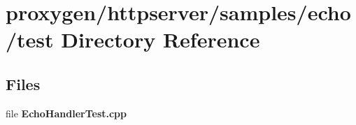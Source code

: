 \section{proxygen/httpserver/samples/echo/test Directory Reference}
\label{dir_1246853a1869355b97e62e25696b4e3d}
\subsection*{Files}
\begin{DoxyCompactItemize}
\item 
file {\bf Echo\+Handler\+Test.\+cpp}
\end{DoxyCompactItemize}
